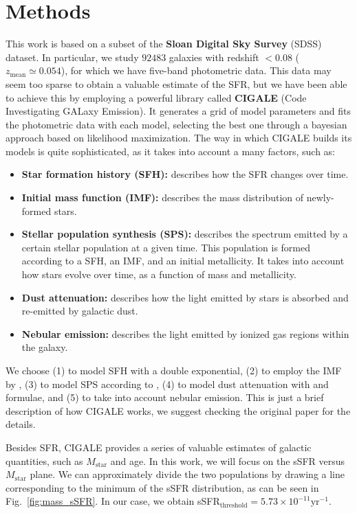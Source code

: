 \documentclass[fleqn,usenatbib]{mnras}
\begin{document}
\section{Methods}\label{sec:methods}
This work is based on a subset of the \textbf{Sloan Digital Sky Survey} (SDSS) dataset. In particular, we study $92483$ galaxies with redshift $< 0.08$ ($z_{\text{mean}} \simeq 0.054$), for which we have five-band photometric data. This data may seem too sparse to obtain a valuable estimate of the SFR, but we have been able to achieve this by employing a powerful library called \textbf{CIGALE} (Code Investigating GALaxy Emission). It generates a grid of model parameters and fits the photometric data with each model, selecting the best one through a bayesian approach based on likelihood maximization. The way in which CIGALE builds its models is quite sophisticated, as it takes into account a many factors, such as:
\begin{itemize}[left=6pt]
    \item \textbf{Star formation history (SFH):} describes how the SFR changes over time.
    \item \textbf{Initial mass function (IMF):} describes the mass distribution of newly-formed stars.
    \item \textbf{Stellar population synthesis (SPS):} describes the spectrum emitted by a certain stellar population at a given time. This population is formed according to a SFH, an IMF, and an initial metallicity. It takes into account how stars evolve over time, as a function of mass and metallicity.
    \item \textbf{Dust attenuation:} describes how the light emitted by stars is absorbed and re-emitted by galactic dust.
    \item \textbf{Nebular emission:} describes the light emitted by ionized gas regions within the galaxy.
\end{itemize}
We choose (1) to model SFH with a double exponential, (2) to employ the IMF by \citet{Chabrier_2003}, (3) to model SPS according to \citet{Bruzual_2003}, (4) to model dust attenuation with \citet{Calzetti_2000} and \citet{Leitherer_2002} formulae, and (5) to take into account nebular emission. This is just a brief description of how CIGALE works, we suggest checking the original paper \citep{Boquien_2019} for the details.

Besides SFR, CIGALE provides a series of valuable estimates of galactic quantities, such as $M_{\text{star}}$ and age. In this work, we will focus on the sSFR versus $M_{\text{star}}$ plane. We can approximately divide the two populations by drawing a line corresponding to the minimum of the sSFR distribution, as can be seen in Fig.~\ref{fig:mass_sSFR}. In our case, we obtain sSFR$_{\text{threshold}} = 5.73 \times 10^{-11} \text{yr}^{-1}$.
\end{document}
